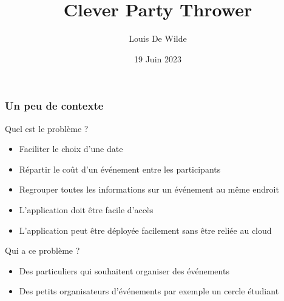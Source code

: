 \documentclass[aspectratio=169]{beamer}
\title{Clever Party Thrower}
\author{Louis De Wilde}
\date{19 Juin 2023}
\begin{document}
    \frame{\titlepage}
    \begin{frame}
        \frametitle{Un peu de contexte}
        Quel est le problème ?
        \begin{itemize}
            \item Faciliter le choix d'une date
            \item Répartir le coût d'un événement entre les participants
            \item Regrouper toutes les informations sur un événement au même endroit
            \item L'application doit être facile d'accès
            \item L'application peut être déployée facilement sans être reliée au cloud
        \end{itemize}
        Qui a ce problème ?
        \begin{itemize}
            \item Des particuliers qui souhaitent organiser des événements
            \item Des petits organisateurs d'événements par exemple un cercle étudiant
        \end{itemize}
    \end{frame}
\end{document}
